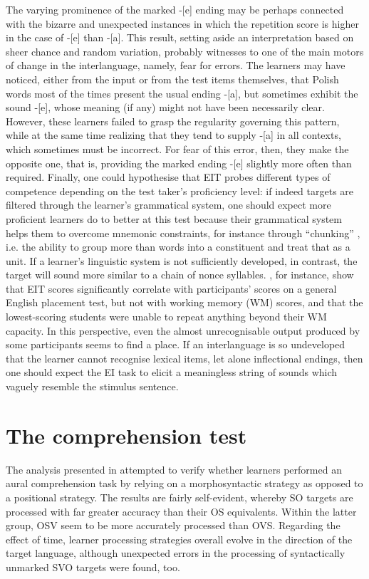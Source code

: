 The varying prominence of the marked -[e] ending may be perhaps connected with the bizarre and unexpected instances in which the repetition score is higher in the case of -[e] than -[a]. This result, setting aside an interpretation based on sheer chance and random variation, probably witnesses to one of the main motors of change in the interlanguage, namely, fear for errors. The learners may have noticed, either from the input or from the test items themselves, that Polish words most of the times present the usual ending -[a], but sometimes exhibit the sound -[e], whose meaning (if any) might not have been necessarily clear. However, these learners failed to grasp the regularity governing this pattern, while at the same time realizing that they tend to supply -[a] in all contexts, which sometimes must be incorrect. For fear of this error, then, they make the opposite one, that is, providing the marked ending -[e] slightly more often than required. Finally, one could hypothesise that EIT probes different types of competence depending on the test taker's proficiency level: if indeed targets are filtered through the learner's grammatical system, one should expect more proficient learners do to better at this test because their grammatical system helps them to overcome mnemonic constraints, for instance through ``chunking'' \citep{Miller1956}, i.e. the ability to group more than words into a constituent and treat that as a unit. If a learner's linguistic system is not sufficiently developed, in contrast, the target will sound more similar to a chain of nonce syllables. \citet{OkuraLonsdale2012}, for instance, show that EIT scores significantly correlate with participants' scores on a general English placement test, but not with working memory (WM) scores, and that the lowest-scoring students were unable to repeat anything beyond their WM capacity. In this perspective, even the almost unrecognisable output produced by some participants seems to find a place. If an interlanguage is so undeveloped that the learner cannot recognise lexical items, let alone inflectional endings, then one should expect the EI task to elicit a meaningless string of sounds which vaguely resemble the stimulus sentence.

\section{The comprehension test}\label{sec:08:3}

The analysis presented in  attempted to verify whether learners performed an aural comprehension task by relying on a morphosyntactic strategy as opposed to a positional strategy. The results are fairly self-evident, whereby SO targets are processed with far greater accuracy than their OS equivalents. Within the latter group, OSV seem to be more accurately processed than OVS. Regarding the effect of time, learner processing strategies overall evolve in the direction of the target language, although unexpected errors in the processing of syntactically unmarked SVO targets were found, too.

